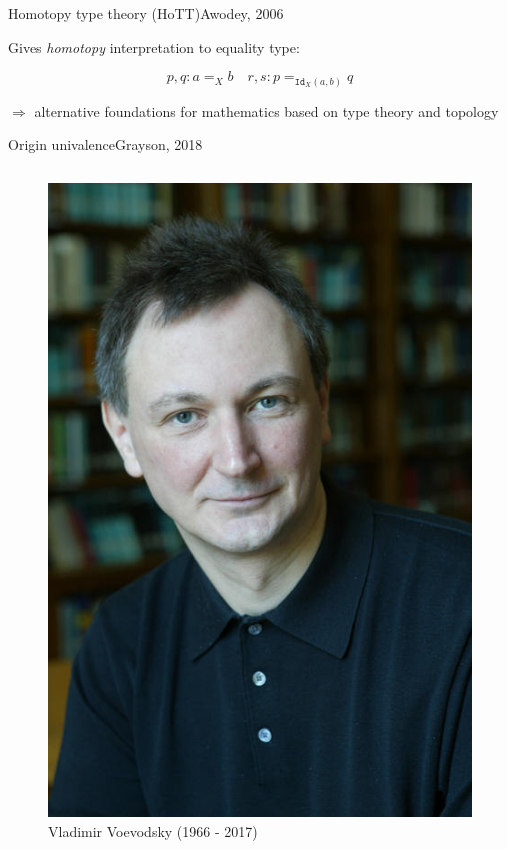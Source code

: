 \documentclass[english]{beamer}
\begin{document}
\begin{frame}{Homotopy type theory (HoTT)}{Awodey, 2006}

Gives \emph{homotopy} interpretation to equality type:

\centering
$$ p,q : a =_X b \quad r,s : p =_{\texttt{Id}_X(a,b)} q$$ 




$\Rightarrow$ alternative foundations for mathematics based on type theory and topology

\end{frame}




\begin{frame}{Origin univalence}{Grayson, 2018}

\begin{columns}[c]
        \begin{center}
            \begin{figure}[h!]
                \includegraphics[height=.7\textheight]{figures/voevodsky.jpg}
                \caption{Vladimir Voevodsky (1966 - 2017)}
            \end{figure} 
        \end{center}


\end{columns}
\end{frame}
\end{document}
